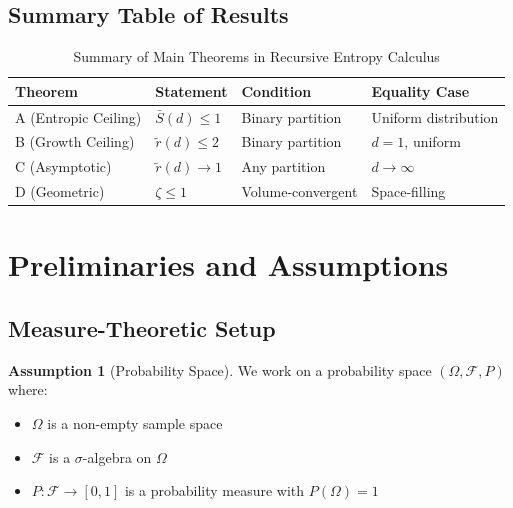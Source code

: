 \documentclass[11pt,a4paper]{article}
\theoremstyle{definition}
\newtheorem{assumption}[theorem]{Assumption}
\theoremstyle{remark}
\newcommand{\Sbar}{\bar{S}}
\newcommand{\rtilde}{\tilde{r}}
\newcommand{\Field}{\mathcal{F}}
\begin{document}
\subsection{Summary Table of Results}

\begin{table}[H]
\centering
\caption{Summary of Main Theorems in Recursive Entropy Calculus}
\label{tab:main_results}
\begin{tabular}{@{}llll@{}}
\toprule
\textbf{Theorem} & \textbf{Statement} & \textbf{Condition} & \textbf{Equality Case} \\
\midrule
A (Entropic Ceiling) & $\Sbar(d) \leq 1$ & Binary partition & Uniform distribution \\
B (Growth Ceiling) & $\rtilde(d) \leq 2$ & Binary partition & $d=1$, uniform \\
C (Asymptotic) & $\rtilde(d) \to 1$ & Any partition & $d \to \infty$ \\
D (Geometric) & $\zeta \leq 1$ & Volume-convergent & Space-filling \\
\bottomrule
\end{tabular}
\end{table}

\section{Preliminaries and Assumptions}
\label{sec:preliminaries}

\subsection{Measure-Theoretic Setup}

\begin{assumption}[Probability Space]
\label{ass:prob_space}
We work on a probability space $(\Omega, \Field, P)$ where:
\begin{itemize}[nosep]
    \item $\Omega$ is a non-empty sample space
    \item $\Field$ is a $\sigma$-algebra on $\Omega$
    \item $P: \Field \to [0,1]$ is a probability measure with $P(\Omega) = 1$
\end{itemize}
\end{assumption}
\end{document}
